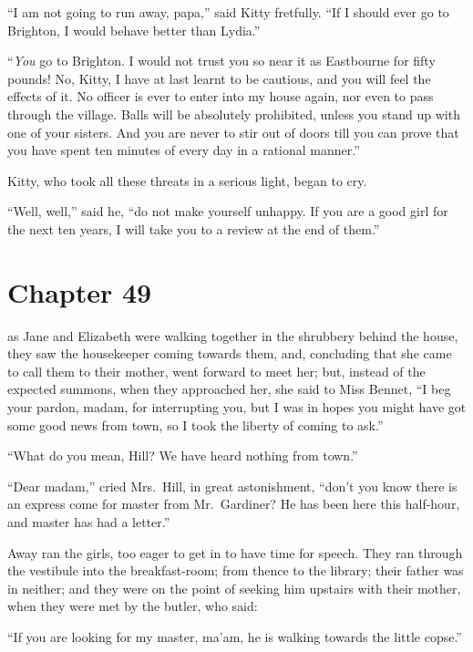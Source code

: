 ``I am not going to run away, papa,'' said Kitty fretfully.  ``If I
should ever go to Brighton, I would behave better than Lydia.''

``\emph{You} go to Brighton.  I would not trust you so near it as
Eastbourne for fifty pounds!  No, Kitty, I have at last learnt to
be cautious, and you will feel the effects of it.  No officer is ever
to enter into my house again, nor even to pass through the
village.  Balls will be absolutely prohibited, unless you stand up
with one of your sisters.  And you are never to stir out of doors
till you can prove that you have spent ten minutes of every day
in a rational manner.''

Kitty, who took all these threats in a serious light, began to cry.

``Well, well,'' said he, ``do not make yourself unhappy.  If you
are a good girl for the next ten years, I will take you to a review
at the end of them.''



\chapter{Chapter 49}


 as Jane and Elizabeth were
walking together in the shrubbery behind the house, they saw
the housekeeper coming towards them, and, concluding that she
came to call them to their mother, went forward to meet her;
but, instead of the expected summons, when they approached
her, she said to Miss Bennet, ``I beg your pardon, madam, for
interrupting you, but I was in hopes you might have got some
good news from town, so I took the liberty of coming to ask.''

``What do you mean, Hill?  We have heard nothing from town.''

``Dear madam,'' cried Mrs.\ Hill, in great astonishment, ``don't
you know there is an express come for master from Mr.\ Gardiner?
He has been here this half-hour, and master has had a letter.''

Away ran the girls, too eager to get in to have time for speech.
They ran through the vestibule into the breakfast-room; from
thence to the library; their father was in neither; and they
were on the point of seeking him upstairs with their mother,
when they were met by the butler, who said:

``If you are looking for my master, ma'am, he is walking
towards the little copse.''

